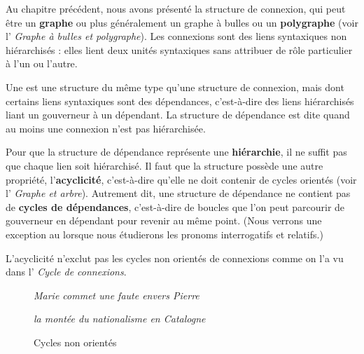 Au chapitre précédent, nous avons présenté la structure de connexion, qui peut être un \textbf{graphe} ou plus généralement un graphe à bulles ou un \textbf{polygraphe} (voir l’ \textit{Graphe à bulles et polygraphe}). Les connexions sont des liens syntaxiques non hiérarchisés : elles lient deux unités syntaxiques sans attribuer de rôle particulier à l’un ou l’autre.

{Une  est une structure du même type qu’une structure de connexion, mais dont certains liens syntaxiques sont des dépendances, c’est-à-dire des liens hiérarchisés liant un gouverneur à un dépendant. La structure de dépendance est dite  quand au moins une connexion n’est pas hiérarchisée.}

Pour que la structure de dépendance représente une \textbf{hiérarchie}, il ne suffit pas que chaque lien soit hiérarchisé. Il faut que la structure possède une autre propriété, l’\textbf{acyclicité}, c’est-à-dire qu’elle ne doit contenir de cycles orientés (voir l’ \textit{Graphe et arbre}). Autrement dit, une structure de dépendance ne contient pas de \textbf{cycles de dépendances}, c’est-à-dire de boucles que l’on peut parcourir de gouverneur en dépendant pour revenir au même point. (Nous verrons une exception au  lorsque nous étudierons les pronoms interrogatifs et relatifs.)

L’acyclicité n’exclut pas les cycles non orientés de connexions comme on l’a vu dans l’ \textit{Cycle de connexions}.

\begin{figure}
\begin{minipage}{.5\textwidth}\centering
\textit{Marie commet une faute envers Pierre}\medskip\\
\end{minipage}%
\begin{minipage}{.5\textwidth}\centering
\textit{la montée du nationalisme en Catalogne}\medskip\\
\end{minipage}
\caption{Cycles non orientés\label{fig:}}
\end{figure}

